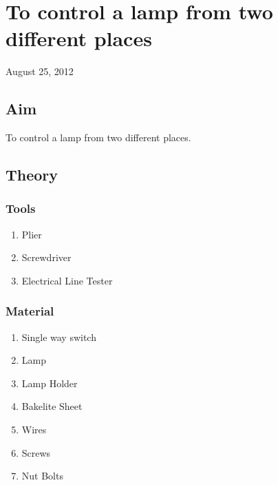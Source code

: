 \chapter{To control a lamp from two different places}
\begin{flushright}
August 25, 2012
\end{flushright}
\section{Aim}
To control a lamp from two different places.

\section{Theory}
	\subsection {Tools}
		\begin{enumerate}
			\item Plier
			\item Screwdriver
			\item Electrical Line Tester
		\end{enumerate}
	\subsection {Material}
		\begin{enumerate}
			\item Single way switch
			\item Lamp
			\item Lamp Holder
			\item Bakelite Sheet
			\item Wires
			\item Screws
			\item Nut Bolts
		\end{enumerate}
